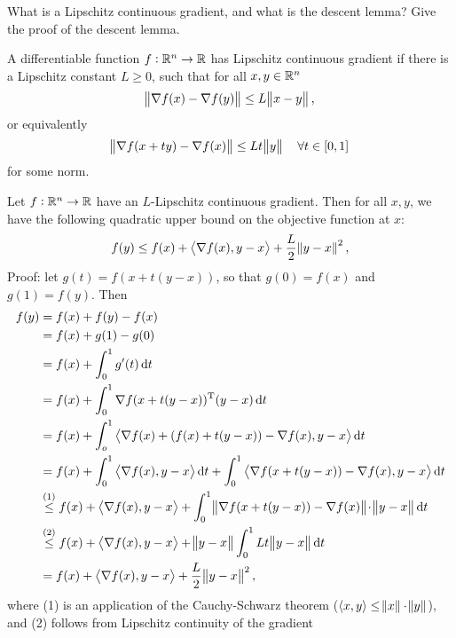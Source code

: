 \documentclass{article}
\begin{document}
\begin{question}
  What is a Lipschitz continuous gradient, and what is the descent lemma?  Give the proof of the
  descent lemma.
\end{question}

A differentiable function \(f: \mathbb{R}^n \to \mathbb{R}\) has Lipschitz continuous gradient if there is
a Lipschitz constant \(L \geq 0\), such that for all \(x, y \in \mathbb{R}^n\)
\begin{equation*}
  \enVert{\nabla f(x) - \nabla f(y)} \leq L \enVert[1]{x - y},
\end{equation*}
or equivalently
\begin{equation*}
  \enVert{\nabla f(x + ty) - \nabla f(x)} \leq Lt \enVert[1]{y} \quad \forall t \in [0, 1]
\end{equation*}
for some norm.

Let \(f: \mathbb{R}^n \to \mathbb{R}\) have an \(L\)-Lipschitz continuous gradient.  Then for all \(x, y\), we
have the following quadratic upper bound on the objective function at \(x\):
\begin{equation*}
  f(y) \leq f(x) + \iprod{\nabla f(x)}{y - x} + \frac{L}{2}\enVert{y - x}^2,
\end{equation*}
Proof: let \(g(t) = f(x + t(y - x))\), so that \(g(0) = f(x)\) and \(g(1) = f(y)\). Then
\begin{align*}
  f(y) &= f(x) + f(y) - f(x) \\
       &= f(x) + g(1) - g(0) \\
       &= f(x) + \int_0^1 g'(t) \dif t \\
       &= f(x) + \int_0^1 \T{\nabla f(x + t(y - x))} (y - x) \dif t \\
       &= f(x) + \int_o^1 \iprod{\nabla f(x) + (f(x) + t(y - x)) - \nabla f(x)}{y - x} \dif t \\
       &= f(x) + \int_0^1 \iprod{\nabla f(x)}{y - x} \dif t
         + \int_0^1 \iprod{\nabla f(x + t(y - x)) - \nabla f(x)}{y - x} \dif t \\
       &\overset{(1)}{\leq} f(x) + \iprod{\nabla f(x)}{y - x}
         + \int_0^1 \enVert[1]{\nabla f(x + t(y - x)) - \nabla f(x)}\! \cdot \enVert[1]{y - x} \dif t \\
       &\overset{(2)}{\leq} f(x) + \iprod{\nabla f(x)}{y - x} + \enVert[1]{y - x} \int_0^1 Lt\enVert[1]{y - x} \dif t \\
       &= f(x) + \iprod{\nabla f(x)}{y - x} + \frac{L}{2}\enVert[1]{y - x}^2,
\end{align*}
where (1) is an application of the Cauchy-Schwarz theorem
(\(\langle x, y \rangle \leq \enVert{x} \cdot \enVert{y}\)), and (2) follows from Lipschitz
continuity of the gradient
\end{document}
